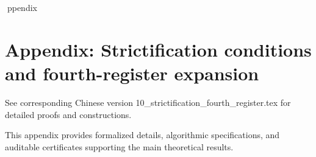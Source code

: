 ppendix

\section*{Appendix: Strictification conditions and fourth-register expansion}

See corresponding Chinese version 10_strictification_fourth_register.tex for detailed proofs and constructions.

This appendix provides formalized details, algorithmic specifications, and auditable certificates supporting the main theoretical results.
